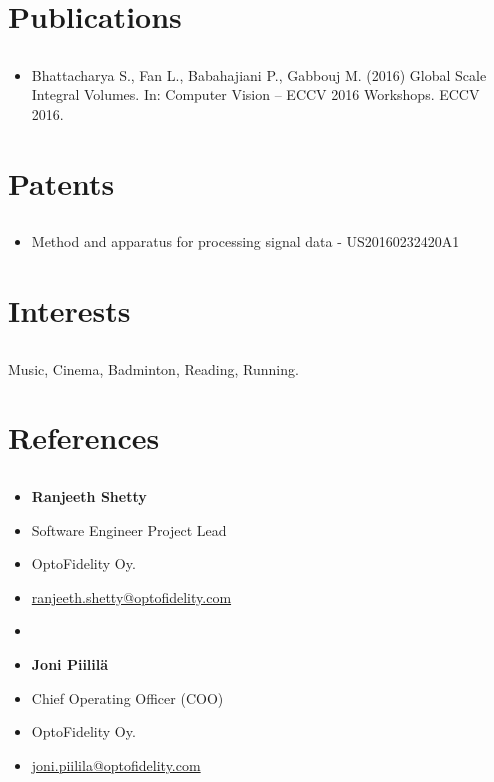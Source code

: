 \documentclass{article}
\begin{document}
\section{Publications}
\subsection{}
\begin{itemize}[label={--}]
  \itemsep0em 
  \item Bhattacharya S., Fan L., Babahajiani P., Gabbouj M. (2016) Global Scale
    Integral Volumes. In: Computer Vision – ECCV 2016 Workshops. ECCV 2016.
\end{itemize}

\section{Patents}
\subsection{}
\begin{itemize}[label={--}]
  \itemsep0em 
  \item Method and apparatus for processing signal data - US20160232420A1
\end{itemize}

\section{Interests}
\subsection{}
Music, Cinema, Badminton, Reading, Running.
\subsection{}


\section{References}
\subsection{}
\begin{itemize}[label={}]
\itemsep0em 
  \item \textbf{Ranjeeth Shetty}
  \item Software Engineer Project Lead
  \item OptoFidelity Oy.
  \item \href{mailto:me@example.com}{ranjeeth.shetty@optofidelity.com}

  \item 

  \item \textbf{Joni Piililä}
  \item Chief Operating Officer (COO)
  \item OptoFidelity Oy.
  \item \href{mailto:me@example.com}{joni.piilila@optofidelity.com}
\end{itemize}

\subsection{}
\end{document}
